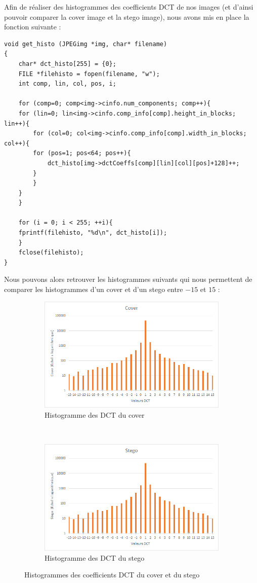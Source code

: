 Afin de réaliser des histogrammes des coefficients DCT de nos images (et d'ainsi pouvoir comparer la cover image et la stego image), nous avons mis en place la fonction suivante :
\begin{lstlisting}[style=customc]
void get_histo (JPEGimg *img, char* filename)
{
    char* dct_histo[255] = {0};
    FILE *filehisto = fopen(filename, "w");
    int comp, lin, col, pos, i;

    for (comp=0; comp<img->cinfo.num_components; comp++){
	for (lin=0; lin<img->cinfo.comp_info[comp].height_in_blocks; lin++){
	    for (col=0; col<img->cinfo.comp_info[comp].width_in_blocks; col++){
		for (pos=1; pos<64; pos++){
		    dct_histo[img->dctCoeffs[comp][lin][col][pos]+128]++;
		}
	    }
	}
    }

    for (i = 0; i < 255; ++i){
	fprintf(filehisto, "%d\n", dct_histo[i]);
    }
    fclose(filehisto);
}
\end{lstlisting}
Nous pouvons alors retrouver les histogrammes suivants qui nous permettent de comparer les histogrammes d'un cover et d'un stego entre $-15$ et $15$ :
\begin{figure}[H]
    \centering
    \begin{subfigure}[b]{0.45\textwidth}
	\includegraphics[width=\textwidth]{img/cover_histo.png}
	\caption{Histogramme des DCT du cover}
	\label{img:13}
    \end{subfigure}
    ~
    \begin{subfigure}[b]{0.45\textwidth}
	\includegraphics[width=\textwidth]{img/stego_histo.png}
	\caption{Histogramme des DCT du stego}
	\label{img:14}
    \end{subfigure}
    \caption{Histogrammes des coefficients DCT du cover et du stego}\label{fig:histo}
\end{figure}
